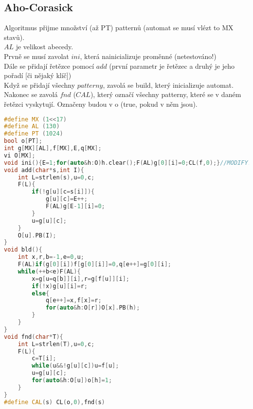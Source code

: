 \documentclass[11pt]{article}
\begin{document}
\subsection{Aho-Corasick}
Algoritmus přijme množství (až \textsf{PT}) patternů (automat se musí vlézt to \textsf{MX} stavů).
\\$AL$ je velikost abecedy.
\\Prvně se musí zavolat $ini$, která nainicializuje proměnné (netestováno!)
\\Dále se přidají řetězce pomocí $add$ (první parametr je řetězec a druhý je jeho pořadí [či nějaký klíč])
\\Když se přidají všechny $patterny$, zavolá se build, který inicializuje automat.
\\Nakonec se zavolá $fnd$ ($CAL$), který označí všechny patterny, které se v daném řetězci vyskytují. Označeny budou v \textsf{o} (true, pokud v něm jsou).
\begin{lstlisting}[language=C++]
#define MX (1<<17)
#define AL (130)
#define PT (1024)
bool o[PT];
int g[MX][AL],f[MX],E,q[MX];
vi O[MX];
void ini(){E=1;for(auto&h:O)h.clear();F(AL)g[0][i]=0;CL(f,0);}//MODIFY!! - no test for 2+
void add(char*s,int I){
    int L=strlen(s),u=0,c;
    F(L){
        if(!g[u][c=s[i]]){
            g[u][c]=E++;
            F(AL)g[E-1][i]=0;
        }
        u=g[u][c];
    }
    O[u].PB(I);
}
void bld(){
    int x,r,b=-1,e=0,u;
    F(AL)if(g[0][i])f[g[0][i]]=0,q[e++]=g[0][i];
    while(++b<e)F(AL){
        x=g[u=q[b]][i],r=g[f[u]][i];
        if(!x)g[u][i]=r;
        else{
            q[e++]=x,f[x]=r;
            for(auto&h:O[r])O[x].PB(h);
        }
    }
}
void fnd(char*T){
    int L=strlen(T),u=0,c;
    F(L){
        c=T[i];
        while(u&&!g[u][c])u=f[u];
        u=g[u][c];
        for(auto&h:O[u])o[h]=1;
    }
}
#define CAL(s) CL(o,0),fnd(s)
\end{lstlisting}
\end{document}
